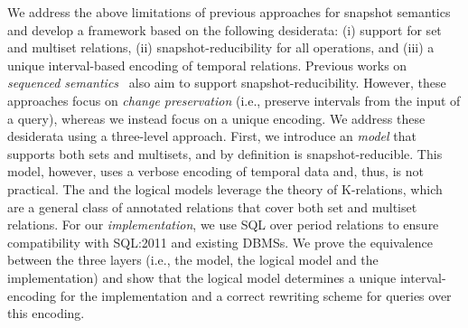 We address the above limitations of previous approaches for
snapshot semantics and develop a framework based on the following desiderata:
(i) support for set and multiset relations, (ii) snapshot-reducibility for all
operations, and (iii) a unique interval-based encoding of temporal relations.
%
Previous works on \textit{sequenced
semantics}~\cite{DBLP:reference/db/BohlenJ09,DignosBGJ16,DignosBG12} also aim to support
snapshot-reducibility. However, these approaches focus on \textit{change preservation} (i.e., preserve intervals from the input of a query), whereas we instead
focus on a unique encoding.
%
We address these desiderata using a three-level approach. 
First, we
introduce an \textit{ model} that supports both sets and
multisets, and by definition is snapshot-reducible. This model,
however, uses a verbose encoding of temporal data and, thus, is not
practical. %
%
The  and the logical models leverage the theory of
K-relations, which are a general class of annotated relations that
cover both set and multiset relations.  For our
\textit{implementation}, we use SQL over period relations to
ensure compatibility with SQL:2011  and existing DBMSs.
We prove the equivalence between the three layers (i.e., the
 model, the logical model and the implementation) and show
that the logical model determines a unique interval-encoding for the
implementation and a correct rewriting scheme for queries over this
 encoding.

